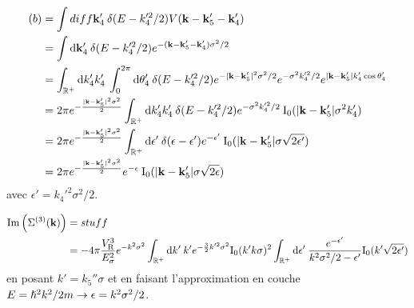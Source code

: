 \begin{align}
(b)&=\int{diff\mathbf{k}_{\mathrm{4}}' \: \delta(E-k_{\mathrm{4}}'^2/2) V(\mathbf{k}-\mathbf{k}_{\mathrm{5}}' -\mathbf{k}_{\mathrm{4}}')} \\
&= \int{\mathop{}\mathopen{}\mathrm{d}\mathbf{k}_{\mathrm{4}}' \: \delta(E-k_{\mathrm{4}}'^2/2) e^{-(\mathbf{k}-\mathbf{k}_{\mathrm{5}}'-\mathbf{k}_{\mathrm{4}}')\sigma^2/2}}\\
&=\int_{\mathbb{R}^+}{\mathop{}\mathopen{}\mathrm{d} k_{\mathrm{4}}' k_{\mathrm{4}}' \: \int_0^{2\pi}{\mathop{}\mathopen{}\mathrm{d}\theta_{\mathrm{4}}' \: \delta(E-k_{\mathrm{4}}'^2/2) e^{-|\mathbf{k}-\mathbf{k}_{\mathrm{5}}'|^2\sigma^2/2} e^{-\sigma^2 k_{\mathrm{4}}'^2/2} e^{|\mathbf{k}-\mathbf{k}_{\mathrm{5}}'| k_{\mathrm{4}}' \cos{\theta_{\mathrm{4}}'} } }} \\
&=2\pi e^{-\frac{|\mathbf{k}-\mathbf{k}_{\mathrm{5}}'|^2\sigma^2}{2}} \int_{\mathbb{R}^+}{\mathop{}\mathopen{}\mathrm{d} k_{\mathrm{4}}' k_{\mathrm{4}}' \:\delta(E- k_{\mathrm{4}}'^2/2) e^{-\sigma^2 k_{\mathrm{4}}'^2/2} \: \mathrm{I_0}(|\mathbf{k}-\mathbf{k}_{\mathrm{5}}'| \sigma^2 k_{\mathrm{4}}')}\\
&=2\pi e^{-\frac{|\mathbf{k}-\mathbf{k}_{\mathrm{5}}'|^2\sigma^2}{2}} \int_{\mathbb{R}^+}{\mathop{}\mathopen{}\mathrm{d}\epsilon' \:\delta(\epsilon-\epsilon') e^{-\epsilon'} \: \mathrm{I_0}(|\mathbf{k}-\mathbf{k}_{\mathrm{5}}'| \sigma \sqrt{2\epsilon'})}\\
&=2\pi e^{-\frac{|\mathbf{k}-\mathbf{k}_{\mathrm{5}}'|^2\sigma^2}{2}} e^{-\epsilon} \: \mathrm{I_0}(|\mathbf{k}-\mathbf{k}_{\mathrm{5}}'| \sigma \sqrt{2\epsilon})
\end{align}
avec $\epsilon'=k_{\mathrm{4}}'^2\sigma^2/2$.





\begin{align}
\mathrm{Im}\left( \Sigma^{(3)}(\mathbf{k})\right)&= stuff \\
&= -4 \pi \frac{V_{\mathrm{R}}^3}{E_{\sigma}^2} e^{-k^2\sigma^2} \int_{\mathbb{R}^+}{\mathop{}\mathopen{}\mathrm{d} k' \: k' e^{-\frac{3}{2}k'^2 \sigma^2} \mathrm{I_0}(k' k \sigma)^2 \int_{\mathbb{R}^+}{\mathop{}\mathopen{}\mathrm{d} \epsilon' \: \frac{e^{-\epsilon'}}{k^2\sigma^2/2-\epsilon'} \mathrm{I_0}(k' \sqrt{2\epsilon'})}}
\end{align}
en posant $k'=k_{\mathrm{5}}''\sigma$ et en faisant l'approximation en couche $E=\hslash^2k^2/2m \rightarrow \epsilon=k^2\sigma^2/2$.